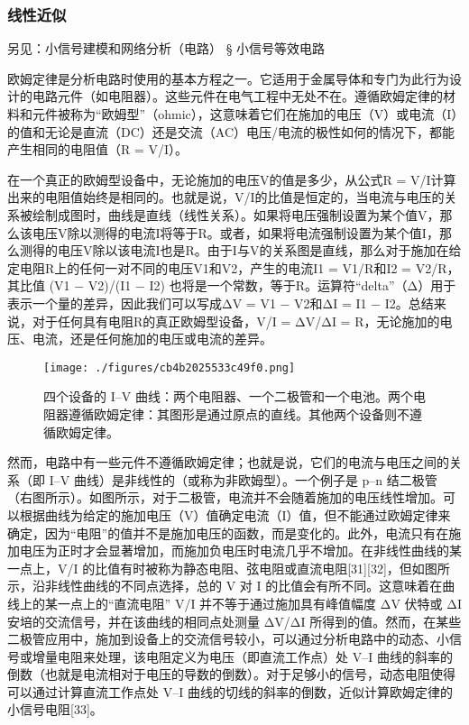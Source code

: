 \subsubsection{线性近似}
另见：小信号建模和网络分析（电路） § 小信号等效电路

欧姆定律是分析电路时使用的基本方程之一。它适用于金属导体和专门为此行为设计的电路元件（如电阻器）。这些元件在电气工程中无处不在。遵循欧姆定律的材料和元件被称为“欧姆型”（ohmic），这意味着它们在施加的电压（V）或电流（I）的值和无论是直流（DC）还是交流（AC）电压/电流的极性如何的情况下，都能产生相同的电阻值（R = V/I）。

在一个真正的欧姆型设备中，无论施加的电压V的值是多少，从公式R = V/I计算出来的电阻值始终是相同的。也就是说，V/I的比值是恒定的，当电流与电压的关系被绘制成图时，曲线是直线（线性关系）。如果将电压强制设置为某个值V，那么该电压V除以测得的电流I将等于R。或者，如果将电流强制设置为某个值I，那么测得的电压V除以该电流I也是R。由于I与V的关系图是直线，那么对于施加在给定电阻R上的任何一对不同的电压V1和V2，产生的电流I1 = V1/R和I2 = V2/R，其比值 (V1 − V2)/(I1 − I2) 也将是一个常数，等于R。运算符“delta”（Δ）用于表示一个量的差异，因此我们可以写成ΔV = V1 − V2和ΔI = I1 − I2。总结来说，对于任何具有电阻R的真正欧姆型设备，V/I = ΔV/ΔI = R，无论施加的电压、电流，还是任何施加的电压或电流的差异。
\begin{figure}[ht]
\centering
\texttt{[image: ./figures/cb4b2025533c49f0.png]}
\caption{四个设备的 I–V 曲线：两个电阻器、一个二极管和一个电池。两个电阻器遵循欧姆定律：其图形是通过原点的直线。其他两个设备则不遵循欧姆定律。} \label{fig_OuMu_8}
\end{figure}
然而，电路中有一些元件不遵循欧姆定律；也就是说，它们的电流与电压之间的关系（即 I–V 曲线）是非线性的（或称为非欧姆型）。一个例子是 p–n 结二极管（右图所示）。如图所示，对于二极管，电流并不会随着施加的电压线性增加。可以根据曲线为给定的施加电压（V）值确定电流（I）值，但不能通过欧姆定律来确定，因为“电阻”的值并不是施加电压的函数，而是变化的。此外，电流只有在施加电压为正时才会显著增加，而施加负电压时电流几乎不增加。在非线性曲线的某一点上，V/I 的比值有时被称为静态电阻、弦电阻或直流电阻[31][32]，但如图所示，沿非线性曲线的不同点选择，总的 V 对 I 的比值会有所不同。这意味着在曲线上的某一点上的“直流电阻” V/I 并不等于通过施加具有峰值幅度 ΔV 伏特或 ΔI 安培的交流信号，并在该曲线的相同点处测量 ΔV/ΔI 所得到的值。然而，在某些二极管应用中，施加到设备上的交流信号较小，可以通过分析电路中的动态、小信号或增量电阻来处理，该电阻定义为电压（即直流工作点）处 V–I 曲线的斜率的倒数（也就是电流相对于电压的导数的倒数）。对于足够小的信号，动态电阻使得可以通过计算直流工作点处 V–I 曲线的切线的斜率的倒数，近似计算欧姆定律的小信号电阻[33]。
